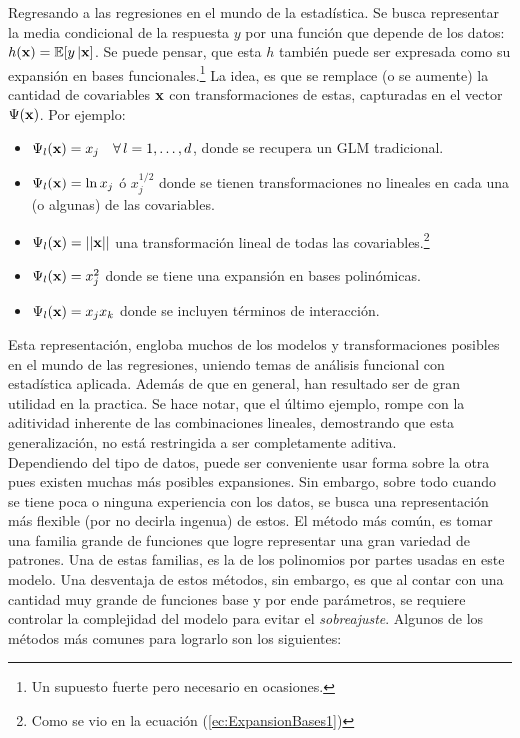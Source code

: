 \documentclass[../Main/Main.tex]{subfiles}
\begin{document}
Regresando a las regresiones en el mundo de la estadística. Se busca representar la media condicional de la respuesta $y$ por una función que depende de los datos: $h(\mathbf{x}) = \mathbb{E}[y\,|\mathbf{x}]$. Se puede pensar, que esta $h$ también puede ser expresada como su expansión en bases funcionales.\footnote{Un supuesto fuerte pero necesario en ocasiones.} La idea, es que se remplace (o se aumente) la cantidad de covariables $\mathbf{x}$ con transformaciones de estas, capturadas en el vector $\Psi(\mathbf{x})$. Por ejemplo:

\begin{itemize}
	\item $\Psi_l(\mathbf{x}) = x_j \quad \forall\,l = 1,\ldots,d$, donde se recupera un GLM tradicional.
	\item $\Psi_l(\mathbf{x}) = \ln x_j$ ó $x_j^{1/2}$ donde se tienen transformaciones no lineales en cada una (o algunas) de las covariables.
	\item $\Psi_l(\mathbf{x}) = ||\mathbf{x}||$ una transformación lineal de todas las covariables.\footnote{Como se vio en la ecuación (\ref{ec:ExpansionBases1})} 
	\item $\Psi_l(\mathbf{x}) = x_j^2$ donde se tiene una expansión en bases polinómicas.
	\item $\Psi_l(\mathbf{x}) = x_jx_k$ donde se incluyen términos de interacción. 
\end{itemize}

Esta representación, engloba muchos de los modelos y transformaciones posibles en el mundo de las regresiones, uniendo temas de análisis funcional con estadística aplicada. Además de que en general, han resultado ser de gran utilidad en la practica. Se hace notar, que el último ejemplo, rompe con la aditividad inherente de las combinaciones lineales, demostrando que esta generalización, no está restringida a ser completamente aditiva.\\

Dependiendo del tipo de datos, puede ser conveniente usar forma sobre la otra pues existen muchas más posibles expansiones. Sin embargo, sobre todo cuando se tiene poca o ninguna experiencia con los datos, se busca una representación más flexible (por no decirla ingenua) de estos. El método más común, es tomar una familia grande de funciones que logre representar una gran variedad de patrones. Una de estas familias, es la de los polinomios por partes usadas en este modelo. Una desventaja de estos métodos, sin embargo, es que al contar con una cantidad muy grande de funciones base y por ende parámetros, se requiere controlar la complejidad del modelo para evitar el \textit{sobreajuste}. Algunos de los métodos más comunes para lograrlo son los siguientes:
\end{document}
